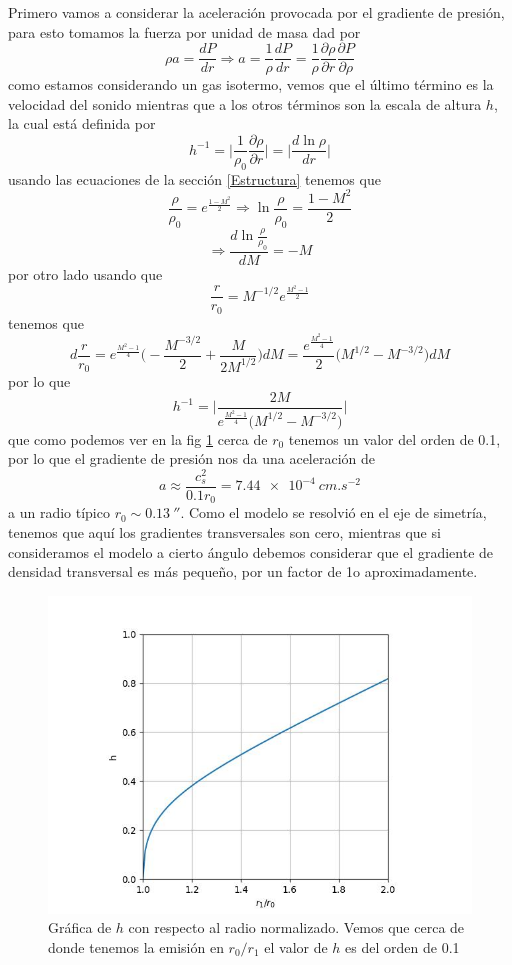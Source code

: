 \documentclass{book}
\begin{document}
Primero vamos a considerar la aceleración provocada por el gradiente de presión, para esto tomamos la fuerza por unidad de masa dad por \[\rho a = \frac{dP}{dr}\Rightarrow a= \frac{1}{\rho}\frac{dP}{dr}=\frac{1}{\rho}\frac{\partial \rho}{\partial r}\frac{\partial P}{\partial\rho}\] como estamos considerando un gas isotermo, vemos que el último término es la velocidad del sonido mientras que a los otros términos son la escala de altura $h$, la cual está definida por  \[h^{-1}=\Big|\frac{1}{\rho_0}\frac{\partial\rho}{\partial r}\Big|=\Big|\frac{d \ln \rho}{dr}\Big|\]
usando las ecuaciones de la sección \ref{Estructura} tenemos que \[\frac{\rho}{\rho_0}=e^{\frac{1-M^2}{2}}\Rightarrow\ln\frac{\rho}{\rho_0}=\frac{1-M^2}{2}\]\[\Rightarrow\frac{d\ln\frac{\rho}{\rho_0}}{dM}=-M\] por otro lado usando que \[\frac{r}{r_0}=M^{-1/2}e^{\frac{M^2-1}{2}}\] tenemos que \[d\frac{r}{r_0}=e^{\frac{M^2-1}{4}}\Big(-\frac{M^{-3/2}}{2}+\frac{M}{2M^{1/2}}\Big)dM = \frac{e^{\frac{M^2-1}{4}}}{2}\Big(M^{1/2}-M^{-3/2}\Big)dM\] por lo que \[h^{-1}=\Big|\frac{2M}{e^{\frac{M^2-1}{4}}\Big(M^{1/2}-M^{-3/2}\Big)}\Big|\] que como podemos ver en la fig \ref{fig:h} cerca de $r_0$ tenemos un valor del orden de 0.1, por lo que el gradiente de presión nos da una aceleración de \[a \approx \frac{c_s^2}{0.1 r_0} = \SI{7.44e-4}{cm.s^{-2}}\] a un radio típico $r_0\sim \SI{0.13}{\arcsecond}$. Como el modelo se resolvió en el eje de simetría, tenemos que aquí los gradientes transversales son cero, mientras que si consideramos el modelo a cierto ángulo debemos considerar que el gradiente de densidad transversal es más pequeño, por un factor de 1o aproximadamente. 

\begin{figure}
    \centering
    \includegraphics{Appendices/h_3.jpg}
    \caption{Gráfica de $h$ con respecto al radio normalizado. Vemos que cerca de donde tenemos la emisión en $r_0/r_1$ el valor de $h$ es del orden de 0.1}
    \label{fig:h}
\end{figure}
\end{document}
